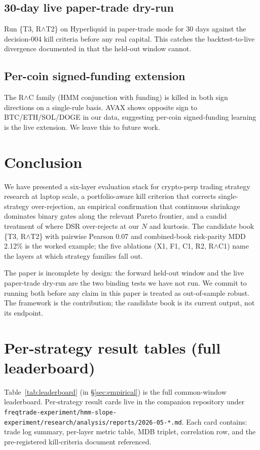 \documentclass[11pt]{article}
\begin{document}
\subsection{30-day live paper-trade dry-run}
Run \{T3, R$\wedge$T2\} on Hyperliquid in paper-trade mode for 30 days
against the decision-004 kill criteria before any real capital. This catches
the backtest-to-live divergence documented in
\citet{backtestlive2026} that the held-out window cannot.

\subsection{Per-coin signed-funding extension}
The R$\wedge$C family (HMM conjunction with funding) is killed in both
sign directions on a single-rule basis. AVAX shows opposite sign to
BTC/ETH/SOL/DOGE in our data, suggesting per-coin signed-funding learning is
the live extension. We leave this to future work.

\section{Conclusion}
\label{sec:conclusion}

We have presented a six-layer evaluation stack for crypto-perp trading
strategy research at laptop scale, a portfolio-aware kill criterion that
corrects single-strategy over-rejection, an empirical confirmation that
continuous shrinkage dominates binary gates along the relevant Pareto
frontier, and a candid treatment of where DSR over-rejects at our $N$ and
kurtosis. The candidate book \{T3, R$\wedge$T2\} with pairwise Pearson 0.07
and combined-book risk-parity MDD 2.12\% is the worked example; the five
ablations (X1, F1, C1, R2, R$\wedge$C1) name the layers at which strategy
families fall out.

The paper is incomplete by design: the forward held-out window and the live
paper-trade dry-run are the two binding tests we have not run. We commit to
running both before any claim in this paper is treated as out-of-sample
robust. The framework is the contribution; the candidate book is its current
output, not its endpoint.



\appendix

\section{Per-strategy result tables (full leaderboard)}
\label{app:leaderboard}
Table~\ref{tab:leaderboard} (in \S\ref{sec:empirical}) is the full
common-window leaderboard. Per-strategy result cards live in the companion
repository under
\texttt{freqtrade-experiment/hmm-slope-experiment/research/analysis/reports/2026-05-*.md}. Each card contains: trade
log summary, per-layer metric table, MDB triplet, correlation row, and the
pre-registered kill-criteria document referenced.
\end{document}
